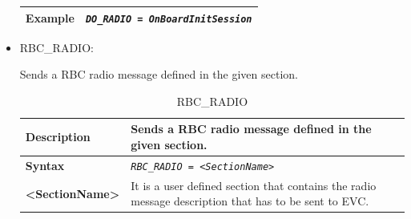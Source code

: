 \documentclass{template/openetcs}
\begin{document}
\begin{itemize}
\begin{longtable}{|l|l|}
				\hline
															
					\begin{minipage}[t]{0.22\linewidth} \textbf{Example} \end{minipage}
				&	\begin{minipage}[t]{0.78\linewidth}	\emph{\texttt{DO\_RADIO = OnBoardInitSession}} \end{minipage} \\
				
				\hline \hline
				
			\end{longtable}
			
		\item RBC\_RADIO:
								
			Sends a RBC radio message defined in the given section.
			
			\begin{longtable}{|l|l|l|}
				\caption{RBC\_RADIO}\\
				\hline
				
					\begin{minipage}[t]{0.22\linewidth} \textbf{Description} \end{minipage} 
				&	\begin{minipage}[t]{0.78\linewidth} Sends a RBC radio message defined in the given section. \end{minipage} \\
								
				\hline
								
					\begin{minipage}[t]{0.22\linewidth} \textbf{Syntax}	\end{minipage}
				&	\multicolumn{2}{l|}{ \begin{minipage}[t]{0.78\linewidth} \emph{\texttt{RBC\_RADIO = <SectionName>}} \end{minipage} } \\
				
				\hline
				
					\begin{minipage}[t]{0.22\linewidth} \textbf{<SectionName>} \end{minipage}
				&	\multicolumn{2}{l|}{ \begin{minipage}[t]{0.78\linewidth} It is a user defined section that contains the radio message description that has to be sent to EVC. \end{minipage} } \\
				
				\hline
															

\end{longtable}
\end{itemize}
\end{document}

